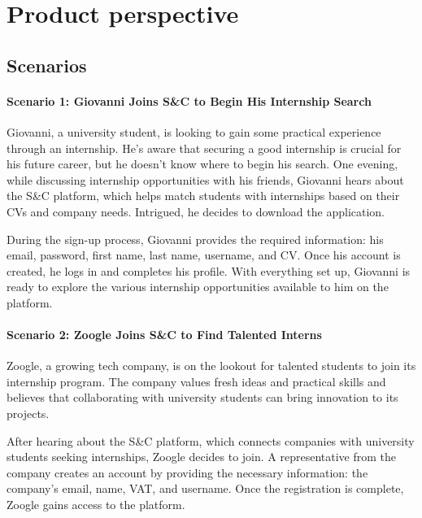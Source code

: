 \section{Product perspective}
\label{sec:product_perspesctive}%

\subsection{Scenarios}
\label{subsec:scenarios}%

\paragraph{Scenario 1: Giovanni Joins S\&C to Begin His Internship Search}

Giovanni, a university student, is looking to gain some practical
experience through an internship. He's aware that securing a good
internship is crucial for his future career, but he
doesn't know where to begin his search. One evening,
while discussing internship opportunities with his friends, Giovanni
hears about the S\&C platform, which helps match students with
internships based on their CVs and company needs. Intrigued, he decides
to download the application.

During the sign-up process, Giovanni provides the required information:
his email, password, first name, last name, username, and CV. Once his
account is created, he logs in and completes his profile. With
everything set up, Giovanni is ready to explore the various internship
opportunities available to him on the platform.


\paragraph{Scenario 2: Zoogle Joins S\&C to Find Talented Interns}

Zoogle, a growing tech company, is on the lookout for talented students
to join its internship program. The company values fresh ideas and
practical skills and believes that collaborating with university
students can bring innovation to its projects.

After hearing about the S\&C platform, which connects companies with
university students seeking internships, Zoogle decides to join. A
representative from the company creates an account by providing the
necessary information: the company's email, name, VAT, and username.
Once the registration is complete, Zoogle gains access to the platform.


